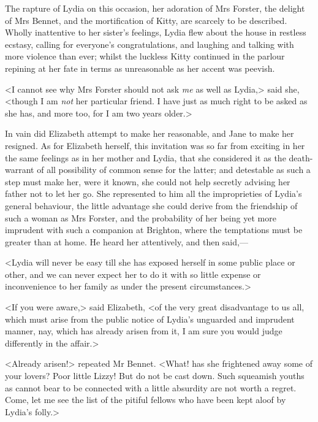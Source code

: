 The rapture of Lydia on this occasion, her adoration of Mrs Forster, the delight of Mrs Bennet, and the mortification of Kitty, are scarcely to be described. Wholly inattentive to her sister's feelings, Lydia flew about the house in restless ecstasy, calling for everyone's congratulations, and laughing and talking with more violence than ever; whilst the luckless Kitty continued in the parlour repining at her fate in terms as unreasonable as her accent was peevish.

<I cannot see why Mrs Forster should not ask \textit{me} as well as Lydia,> said she, <though I am \textit{not} her particular friend. I have just as much right to be asked as she has, and more too, for I am two years older.>

In vain did Elizabeth attempt to make her reasonable, and Jane to make her resigned. As for Elizabeth herself, this invitation was so far from exciting in her the same feelings as in her mother and Lydia, that she considered it as the death-warrant of all possibility of common sense for the latter; and detestable as such a step must make her, were it known, she could not help secretly advising her father not to let her go. She represented to him all the improprieties of Lydia's general behaviour, the little advantage she could derive from the friendship of such a woman as Mrs Forster, and the probability of her being yet more imprudent with such a companion at Brighton, where the temptations must be greater than at home. He heard her attentively, and then said,—

<Lydia will never be easy till she has exposed herself in some public place or other, and we can never expect her to do it with so little expense or inconvenience to her family as under the present circumstances.>

<If you were aware,> said Elizabeth, <of the very great disadvantage to us all, which must arise from the public notice of Lydia's unguarded and imprudent manner, nay, which has already arisen from it, I am sure you would judge differently in the affair.>

<Already arisen!> repeated Mr Bennet. <What! has she frightened away some of your lovers? Poor little Lizzy! But do not be cast down. Such squeamish youths as cannot bear to be connected with a little absurdity are not worth a regret. Come, let me see the list of the pitiful fellows who have been kept aloof by Lydia's folly.>

